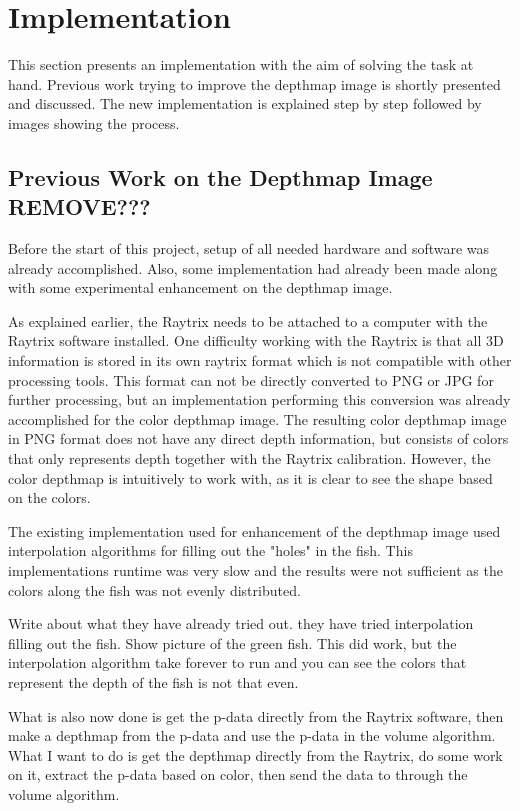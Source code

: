 \section{Implementation}\label{implementation}

This section presents an implementation with the aim of solving the task at hand. Previous work trying to improve the depthmap image is shortly presented and discussed. The new implementation is explained step by step followed by images showing the process.


\subsection{Previous Work on the Depthmap Image {\color{red}REMOVE???}}

Before the start of this project, setup of all needed hardware and software was already accomplished. Also, some implementation had already been made along with some experimental enhancement on the depthmap image.

As explained earlier, the Raytrix needs to be attached to a computer with the Raytrix software installed. One difficulty working with the Raytrix is that all 3D information is stored in its own raytrix format which is not compatible with other processing tools. This format can not be directly converted to PNG or JPG for further processing, but an implementation performing this conversion was already accomplished for the color depthmap image. The resulting color depthmap image in PNG format does not have any direct depth information, but consists of colors that only represents depth together with the Raytrix calibration.
However, the color depthmap is intuitively to work with, as it is clear to see the shape based on the colors.

The existing implementation used for enhancement of the depthmap image used interpolation algorithms for filling out the "holes" in the fish. This implementations runtime was very slow and the results were not sufficient as the colors along the fish was not evenly distributed.



{\color{red}
Write about what they have already tried out. 
they have tried interpolation filling out the fish. Show picture of the green fish. 
This did work, but the interpolation algorithm take forever to run and you can see the colors that represent the depth of the fish is not that even.

What is also now done is get the p-data directly from the Raytrix software, then make a depthmap from the p-data and use the p-data in the volume algorithm. What I want to do is get the depthmap directly from the Raytrix, do some work on it, extract the p-data based on color, then send the data to through the volume algorithm. 
}

